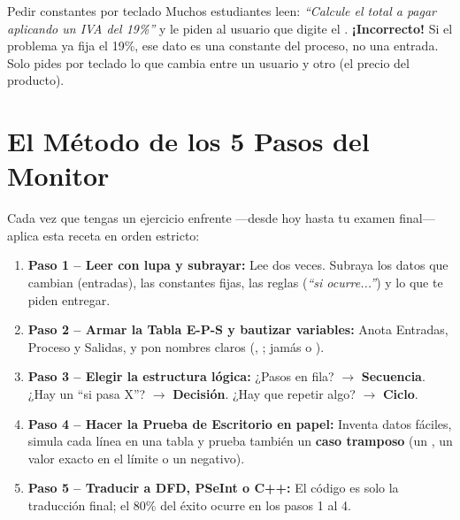 \documentclass[11pt,letterpaper]{article}
\begin{document}
\begin{peligro}{Pedir constantes por teclado}
Muchos estudiantes leen: \textit{``Calcule el total a pagar aplicando un IVA del 19\%''} y le piden al usuario que digite el . \textbf{¡Incorrecto!} Si el problema ya fija el 19\%, ese dato es una constante del proceso, no una entrada. Solo pides por teclado lo que cambia entre un usuario y otro (el precio del producto).
\end{peligro}

\section{El Método de los 5 Pasos del Monitor}


Cada vez que tengas un ejercicio enfrente —desde hoy hasta tu examen final— aplica esta receta en orden estricto:

\begin{enumerate}
  \item \textbf{Paso 1 -- Leer con lupa y subrayar:} Lee dos veces. Subraya los datos que cambian (entradas), las constantes fijas, las reglas (\textit{``si ocurre...''}) y lo que te piden entregar.
  \item \textbf{Paso 2 -- Armar la Tabla E-P-S y bautizar variables:} Anota Entradas, Proceso y Salidas, y pon nombres claros (, ; jamás  o ).
  \item \textbf{Paso 3 -- Elegir la estructura lógica:} ¿Pasos en fila? $\rightarrow$ \textbf{Secuencia}. ¿Hay un ``si pasa X''? $\rightarrow$ \textbf{Decisión}. ¿Hay que repetir algo? $\rightarrow$ \textbf{Ciclo}.
  \item \textbf{Paso 4 -- Hacer la Prueba de Escritorio en papel:} Inventa datos fáciles, simula cada línea en una tabla y prueba también un \textbf{caso tramposo} (un , un valor exacto en el límite o un negativo).
  \item \textbf{Paso 5 -- Traducir a DFD, PSeInt o C++:} El código es solo la traducción final; el 80\% del éxito ocurre en los pasos 1 al 4.
\end{enumerate}

\end{document}
